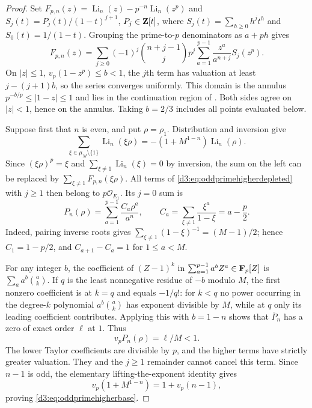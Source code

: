 \begin{proof}
Set $F_{p,n}(z)=\operatorname{Li}_n(z)-p^{-n}
\operatorname{Li}_n(z^p)$ and
$S_j(t)=P_j(t)/(1-t)^{j+1}$, $P_j\in\mathbf Z[t]$, where
$S_j(t)=\sum_{h\geq0}h^jt^h$ and $S_0(t)=1/(1-t)$.
Grouping the prime-to-$p$ denominators as $a+ph$ gives
\begin{equation}\label{d3:eq:oddprimehigherdepleted}
 F_{p,n}(z)=\sum_{j\geq0}(-1)^j\binom{n+j-1}{j}p^j
       \sum_{a=1}^{p-1}\frac{z^a}{a^{n+j}}S_j(z^p).
\end{equation}
On $|z|\leq1$, $v_p(1-z^p)\leq b<1$, the $j$th term has
valuation at least $j-(j+1)b$, so the series converges uniformly.
This domain is the annulus
$p^{-b/p}\leq|1-z|\leq1$ and lies in the continuation region
of \cite[Theorem~2.7(3)]{BesserDeJeuAlgorithm}.
Both sides agree on $|z|<1$, hence on the annulus. Taking
$b=2/3$ includes all points evaluated below.

Suppose first that $n$ is even, and put $\rho=\rho_1$.
Distribution and inversion
\cite[Proposition~2.10]{BesserDeJeuAlgorithm} give
\[
 \sum_{\xi\in\mu_M\setminus\{1\}}\operatorname{Li}_n(\xi\rho)
       =-(1+M^{1-n})\operatorname{Li}_n(\rho).
\]
Since $(\xi\rho)^p=\xi$ and
$\sum_{\xi\ne1}\operatorname{Li}_n(\xi)=0$ by inversion,
the sum on the left can be replaced by
$\sum_{\xi\ne1}F_{p,n}(\xi\rho)$.
All terms of \eqref{d3:eq:oddprimehigherdepleted} with $j\geq1$
then belong to $p\mathcal O_{E_1}$. Its $j=0$ sum is
\[
 P_n(\rho)=\sum_{a=1}^{p-1}\frac{C_a\rho^a}{a^n},\qquad
 C_a=\sum_{\xi\ne1}\frac{\xi^a}{1-\xi}=a-\frac p2.
\]
Indeed, pairing inverse roots gives
$\sum_{\xi\ne1}(1-\xi)^{-1}=(M-1)/2$; hence
$C_1=1-p/2$, and $C_{a+1}-C_a=1$ for $1\leq a<M$.

For any integer $b$, the coefficient of $(Z-1)^k$ in
$\sum_{a=1}^{p-1}a^bZ^a\in\mathbf F_p[Z]$ is
$\sum_a a^b\binom ak$.
If $q$ is the least nonnegative residue of $-b$ modulo $M$,
the first nonzero coefficient is at $k=q$ and equals $-1/q!$:
for $k<q$ no power occurring in the degree-$k$ polynomial
$a^b\binom ak$ has exponent divisible by $M$, while at $q$
only its leading coefficient contributes.
Applying this with $b=1-n$ shows that $\overline P_n$
has a zero of exact order $\ell$ at $1$. Thus
\[
 v_pP_n(\rho)=\ell/M<1.
\]
The lower Taylor coefficients are divisible by $p$, and the
higher terms have strictly greater valuation. They and the
$j\geq1$ remainder cannot cancel this term.
Since $n-1$ is odd, the elementary lifting-the-exponent identity gives
\[
 v_p(1+M^{1-n})=1+v_p(n-1),
\]
proving \eqref{d3:eq:oddprimehigherbase}.


\end{proof}
